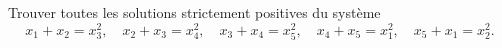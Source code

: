 Trouver toutes les solutions strictement positives du système
\[ x_1 + x_2 = x_3^2,\quad x_2 + x_3 = x_4^2,\quad x_3 + x_4 = x_5^2,\quad x_4 + x_5 = x_1^2,\quad x_5 + x_1 = x_2^2. \]
